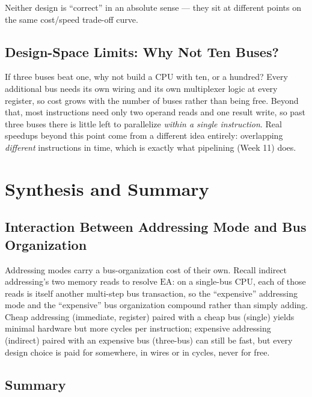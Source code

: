 \documentclass[11pt]{article}
\begin{document}
Neither design is ``correct'' in an absolute sense --- they sit at different points on the same cost/speed trade-off curve.

\subsection{Design-Space Limits: Why Not Ten Buses?}

If three buses beat one, why not build a CPU with ten, or a hundred? Every additional bus needs its own wiring and its own multiplexer logic at every register, so cost grows with the number of buses rather than being free. Beyond that, most instructions need only two operand reads and one result write, so past three buses there is little left to parallelize \emph{within a single instruction}. Real speedups beyond this point come from a different idea entirely: overlapping \emph{different} instructions in time, which is exactly what pipelining (Week 11) does.

\section{Synthesis and Summary}

\subsection{Interaction Between Addressing Mode and Bus Organization}

Addressing modes carry a bus-organization cost of their own. Recall indirect addressing's two memory reads to resolve $\text{EA}$: on a single-bus CPU, each of those reads is itself another multi-step bus transaction, so the ``expensive'' addressing mode and the ``expensive'' bus organization compound rather than simply adding. Cheap addressing (immediate, register) paired with a cheap bus (single) yields minimal hardware but more cycles per instruction; expensive addressing (indirect) paired with an expensive bus (three-bus) can still be fast, but every design choice is paid for somewhere, in wires or in cycles, never for free.

\subsection{Summary}
\end{document}
